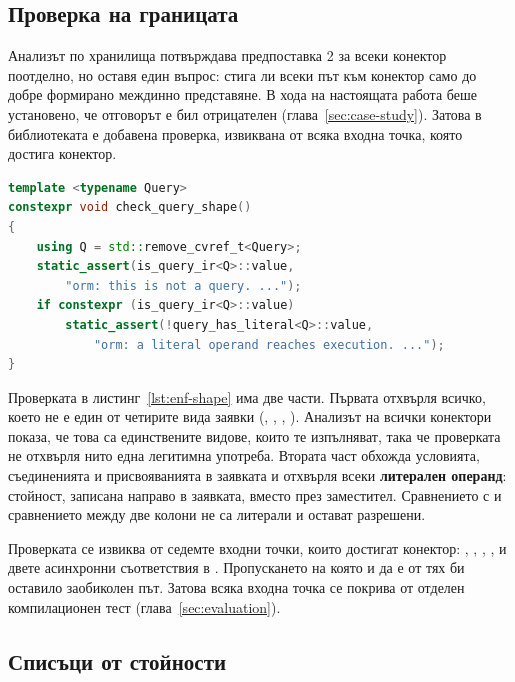 \subsection{Проверка на границата}
\label{sec:enf-boundary}

Анализът по хранилища потвърждава предпоставка 2 за всеки конектор поотделно, но
оставя един въпрос: стига ли всеки път към конектор само до добре формирано
междинно представяне. В хода на настоящата работа беше установено, че отговорът е
бил отрицателен (глава~\ref{sec:case-study}). Затова в библиотеката е добавена
проверка, извиквана от всяка входна точка, която достига конектор.

\noindent\begin{minipage}{\linewidth}
\begin{lstlisting}[language=C++,caption={Проверката на границата (съкратено)},label={lst:enf-shape}]
template <typename Query>
constexpr void check_query_shape()
{
    using Q = std::remove_cvref_t<Query>;
    static_assert(is_query_ir<Q>::value,
        "orm: this is not a query. ...");
    if constexpr (is_query_ir<Q>::value)
        static_assert(!query_has_literal<Q>::value,
            "orm: a literal operand reaches execution. ...");
}
\end{lstlisting}
\end{minipage}

Проверката в листинг~\ref{lst:enf-shape} има две части. Първата отхвърля всичко,
което не е един от четирите вида заявки (,
, , ). Анализът на
всички конектори показа, че това са единствените видове, които те изпълняват,
така че проверката не отхвърля нито една легитимна употреба. Втората част
обхожда условията, съединенията и присвояванията в заявката и отхвърля всеки
\textbf{литерален операнд}: стойност, записана направо в заявката, вместо през
заместител. Сравнението с  и сравнението между две колони не са
литерали и остават разрешени.

Проверката се извиква от седемте входни точки, които достигат конектор:
, , ,
,  и двете асинхронни
съответствия в . Пропускането на която и да е от тях би оставило
заобиколен път. Затова всяка входна точка се покрива от отделен компилационен
тест (глава~\ref{sec:evaluation}).

\subsection{Списъци от стойности}
\label{sec:enf-lists}

